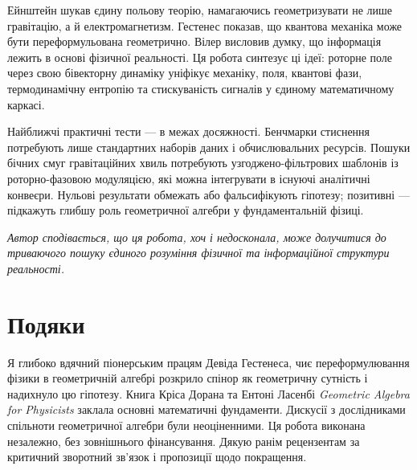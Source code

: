 \documentclass[11pt,a4paper]{article}
\theoremstyle{definition}
\theoremstyle{plain}
\theoremstyle{remark}
\begin{document}
Ейнштейн шукав єдину польову теорію, намагаючись геометризувати не лише гравітацію, а й електромагнетизм. Гестенес показав, що квантова механіка може бути переформульована геометрично. Вілер висловив думку, що інформація лежить в основі фізичної реальності. Ця робота синтезує ці ідеї: роторне поле через свою бівекторну динаміку уніфікує механіку, поля, квантові фази, термодинамічну ентропію та стискуваність сигналів у єдиному математичному каркасі.

Найближчі практичні тести — в межах досяжності. Бенчмарки стиснення потребують лише стандартних наборів даних і обчислювальних ресурсів. Пошуки бічних смуг гравітаційних хвиль потребують узгоджено-фільтрових шаблонів із роторно-фазовою модуляцією, які можна інтегрувати в існуючі аналітичні конвеєри. Нульові результати обмежать або фальсифікують гіпотезу; позитивні — підкажуть глибшу роль геометричної алгебри у фундаментальній фізиці.

\medskip
\noindent\textit{Автор сподівається, що ця робота, хоч і недосконала, може долучитися до триваючого пошуку єдиного розуміння фізичної та інформаційної структури реальності.}

\vspace{1em}

\section*{Подяки}

Я глибоко вдячний піонерським працям Девіда Гестенеса, чиє переформулювання фізики в геометричній алгебрі розкрило спінор як геометричну сутність і надихнуло цю гіпотезу. Книга Кріса Дорана та Ентоні Ласенбі \textit{Geometric Algebra for Physicists} заклала основні математичні фундаменти. Дискусії з дослідниками спільноти геометричної алгебри були неоціненними. Ця робота виконана незалежно, без зовнішнього фінансування. Дякую ранім рецензентам за критичний зворотний зв'язок і пропозиції щодо покращення.

\vspace{1em}
\end{document}
